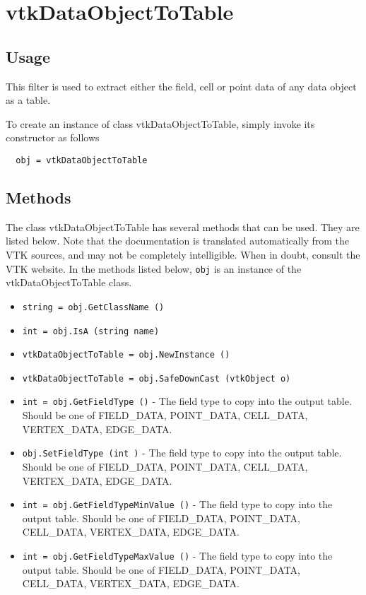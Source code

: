 \section{vtkDataObjectToTable}

\subsection{Usage}

 This filter is used to extract either the field, cell or point data of 
 any data object as a table.

To create an instance of class vtkDataObjectToTable, simply
invoke its constructor as follows
\begin{verbatim}
  obj = vtkDataObjectToTable
\end{verbatim}
\subsection{Methods}

The class vtkDataObjectToTable has several methods that can be used.
  They are listed below.
Note that the documentation is translated automatically from the VTK sources,
and may not be completely intelligible.  When in doubt, consult the VTK website.
In the methods listed below, \verb|obj| is an instance of the vtkDataObjectToTable class.
\begin{itemize}
\item  \verb|string = obj.GetClassName ()|

\item  \verb|int = obj.IsA (string name)|

\item  \verb|vtkDataObjectToTable = obj.NewInstance ()|

\item  \verb|vtkDataObjectToTable = obj.SafeDownCast (vtkObject o)|

\item  \verb|int = obj.GetFieldType ()| -  The field type to copy into the output table.
 Should be one of FIELD\_DATA, POINT\_DATA, CELL\_DATA, VERTEX\_DATA, EDGE\_DATA.

\item  \verb|obj.SetFieldType (int )| -  The field type to copy into the output table.
 Should be one of FIELD\_DATA, POINT\_DATA, CELL\_DATA, VERTEX\_DATA, EDGE\_DATA.

\item  \verb|int = obj.GetFieldTypeMinValue ()| -  The field type to copy into the output table.
 Should be one of FIELD\_DATA, POINT\_DATA, CELL\_DATA, VERTEX\_DATA, EDGE\_DATA.

\item  \verb|int = obj.GetFieldTypeMaxValue ()| -  The field type to copy into the output table.
 Should be one of FIELD\_DATA, POINT\_DATA, CELL\_DATA, VERTEX\_DATA, EDGE\_DATA.

\end{itemize}
